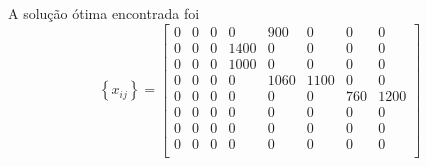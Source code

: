 \documentclass[a4paper]{report}
\begin{document}
A solução ótima encontrada foi \[
    \left\{ x_{ij} \right\} = \begin{bmatrix} 
    0 & 0 & 0 & 0 & 900 & 0 & 0 & 0 \\
    0 & 0 & 0 & 1400 & 0 & 0 & 0  & 0 \\
    0 & 0 & 0 & 1000 & 0 & 0 & 0 & 0   \\
    0 & 0 & 0 & 0 & 1060 & 1100 & 0 & 0   \\
    0 & 0 & 0 & 0 & 0 & 0 & 760 & 1200 \\
    0 & 0 & 0 & 0 & 0 & 0 & 0 & 0 \\
    0 & 0 & 0 & 0 & 0 & 0 & 0 & 0 \\
    0 & 0 & 0 & 0 & 0 & 0 & 0 & 0 \\
\end{bmatrix} 
\] 
\end{document}
